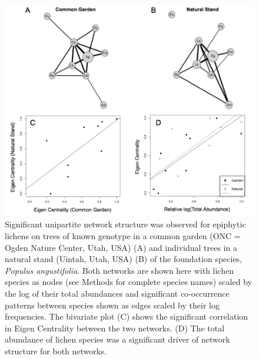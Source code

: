 \documentclass[fleqn,10pt]{wlscirep}
\begin{document}



\clearpage
\newpage

\begin{figure}[ht]
\centering
\includegraphics[width=\linewidth]{fig1}
\caption{Significant unipartite network structure was observed for
  epiphytic lichens on trees of known genotype in a common garden (ONC
  = Ogden Nature Center, Utah, USA) (A) and individual trees in a
  natural stand (Uintah, Utah, USA) (B) of the foundation species,
  \textit{Populus angustifolia}. Both networks are shown here with
  lichen species as nodes (see Methods for complete species names)
  scaled by the log of their total abundances and significant
  co-occurrence patterns between species shown as edges scaled by
  their log frequencies. The bivariate plot (C) shows the significant
  correlation in Eigen Centrality between the two networks. (D) The
  total abundance of lichen species was a significant driver of
  network structure for both networks.}
\label{fig:fig1}
\end{figure}
\end{document}
